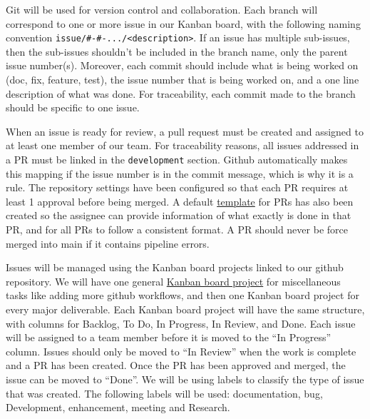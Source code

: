 \documentclass{article}
\begin{document}
Git will be used for version control and collaboration. Each branch will
correspond to one or more issue in our Kanban board, with the following naming
convention \texttt{issue/\#<issue-number1>-\#<issue-number2>-.../<description>}.
If an issue has multiple sub-issues, then the sub-issues shouldn't be included
in the branch name, only the parent issue number(s). Moreover, each commit
should include what is being worked on (doc, fix, feature, test), the issue 
number that is being worked on, and a one line description of what was done.
For traceability, each commit made to the branch should be specific to one
issue.
\newline

When an issue is ready for review, a pull request must be created and assigned
to at least one member of our team. For traceability reasons, all issues
addressed in a PR must be linked in the \texttt{development} section. Github
automatically makes this mapping if the issue number is in the commit message,
which is why it is a rule. The repository settings have been configured so that
each PR requires at least 1 approval before being merged. A default
\href{https://github.com/Team6-SixSense/audio360/blob/main/.github/pull_request_template.md}{template}
for PRs has also been created so the assignee can provide information of what
exactly is done in that PR, and for all PRs to follow a consistent format. A PR
should never be force merged into main if it contains pipeline errors.
\newline

Issues will be managed using the Kanban board projects linked to our github
repository. We will have one general 
\href{https://github.com/orgs/Team6-SixSense/projects/1}{Kanban board project} 
for miscellaneous
tasks like adding more github workflows, and then one Kanban board project for
every major deliverable. Each Kanban board project will have the same structure,
with columns for Backlog, To Do, In Progress, In Review, and Done. Each issue
will be assigned to a team member before it is moved to the ``In Progress''
column. Issues should only be moved to ``In Review'' when the work is complete
and a PR has been created. Once the PR has been approved and merged, the issue
can be moved to ``Done''. We will be using labels to classify the type of issue
that was created. The following labels will be used: documentation, bug,
Development, enhancement, meeting and Research.
\end{document}
